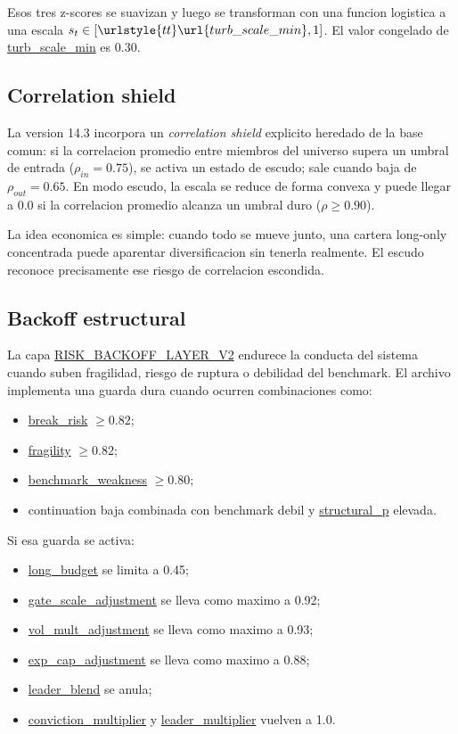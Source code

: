 \documentclass[11pt,letterpaper]{article}
\newcommand{\code}[1]{{\urlstyle{tt}\url{#1}}}
\newcommand{\backoff}{\code{RISK_BACKOFF_LAYER_V2}}
\begin{document}
Esos tres z-scores se suavizan y luego se transforman con una funcion logistica a una escala \(s_t \in [\code{turb\_scale\_min},1]\). El valor congelado de \code{turb\_scale\_min} es 0.30.

\subsection{Correlation shield}
La version 14.3 incorpora un \emph{correlation shield} explicito heredado de la base comun: si la correlacion promedio entre miembros del universo supera un umbral de entrada (\(\rho_{in}=0.75\)), se activa un estado de escudo; sale cuando baja de \(\rho_{out}=0.65\). En modo escudo, la escala se reduce de forma convexa y puede llegar a 0.0 si la correlacion promedio alcanza un umbral duro (\(\rho \ge 0.90\)).

La idea economica es simple: cuando todo se mueve junto, una cartera long-only concentrada puede aparentar diversificacion sin tenerla realmente. El escudo reconoce precisamente ese riesgo de correlacion escondida.

\subsection{Backoff estructural}
La capa \backoff{} endurece la conducta del sistema cuando suben fragilidad, riesgo de ruptura o debilidad del benchmark. El archivo implementa una guarda dura cuando ocurren combinaciones como:
\begin{itemize}
    \item \code{break\_risk} \(\ge 0.82\);
    \item \code{fragility} \(\ge 0.82\);
    \item \code{benchmark\_weakness} \(\ge 0.80\);
    \item continuation baja combinada con benchmark debil y \code{structural\_p} elevada.
\end{itemize}

Si esa guarda se activa:
\begin{itemize}
    \item \code{long\_budget} se limita a 0.45;
    \item \code{gate\_scale\_adjustment} se lleva como maximo a 0.92;
    \item \code{vol\_mult\_adjustment} se lleva como maximo a 0.93;
    \item \code{exp\_cap\_adjustment} se lleva como maximo a 0.88;
    \item \code{leader\_blend} se anula;
    \item \code{conviction\_multiplier} y \code{leader\_multiplier} vuelven a 1.0.
\end{itemize}
\end{document}
